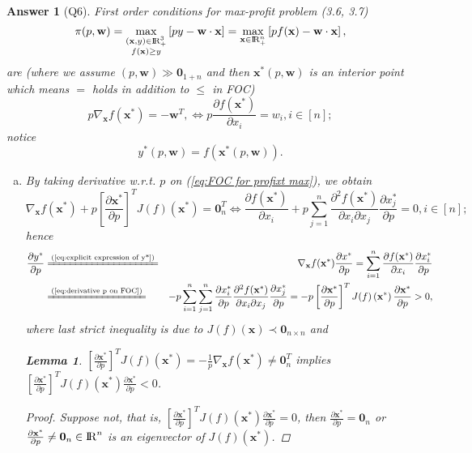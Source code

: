 \documentclass{article}
\newtheorem*{ans}{Answer}
\newtheorem{lem}[theorem]{Lemma}
\newcommand {\Reals}  {{\rm I \! R}}
\newcommand{\1}{{\bf 1}}
\newcommand{\0}{{\mathbf{0}}}
\newcommand{\w}{{\mathbf{w}}}
\newcommand{\x}{{\mathbf{x}}}
\newcommand{\<}{\langle}
\renewcommand{\>}{\rangle}
\begin{document}
\begin{ans}[Q6] First order conditions for max-profit problem (3.6, 3.7) 
	$$ \pi(p, \w) = \max_{\substack{(\x, y ) \in \Reals_+^3 \\ f(\x) \ge y}} \left[ p y - \w \cdot \x \right]  =  \max_{\x \in \Reals_+^n} \left[ p f(\x) - \w \cdot \x \right], $$ are (where we assume $(p, \w) \gg \0_{1+n}$ and then $\x^* (p,\w)$ is an interior point which means $=$ holds in addition to $\le $ in FOC)
\begin{equation}  p 	\nabla_{\x} f(\x^*)  = -\w^T, \Leftrightarrow p\frac{\partial f(\x^*)}{\partial x_i} =  w_i,i \in [n]; \label{eq:FOC for profixt max}
\end{equation}
 notice 
 \begin{equation}y^*(p,\w) = f\left(\x^* (p, \w) \right).\label{eq:explicit expression of y*}
 \end{equation}
	\begin{enumerate}[(a)]
		\item 
		
		
		By taking derivative w.r.t. $p$ on (\ref{eq:FOC for profixt max}), we obtain
\begin{equation} \nabla_{\x} f(\x^*) + p \left[\frac{ \partial \x^*}{\partial p}\right]^T J(f) \left( \x^* \right)  = \0_n^T  \Leftrightarrow \frac{\partial f(\x^*)}{\partial x_i}   +p \sum_{j=1}^n \frac{\partial^2 f(\x^*)}{\partial x_i \partial x_j}\frac{\partial x_j^*}{\partial p}  = 0,i \in [n]; \label{eq:derivative p on FOC}
\end{equation}
		hence 
		\begin{eqnarray*}
		\frac{\partial y^*}{\partial p} & \xlongequal{\text{(\ref{eq:explicit expression of y*})}} &  \nabla_{\x} f(\x^*) \frac{\partial x^*}{\partial p} = \sum_{i = 1}^n \frac{\partial f(\x^*)}{\partial x_i} \frac{\partial x_i^*}{\partial p} \\ &\xlongequal{\text{(\ref{eq:derivative p on FOC})}} &- p 	 \sum_{i = 1}^n\sum_{j=1}^n \frac{\partial x_i^*}{\partial p} \frac{\partial^2 f(\x^*)}{\partial x_i \partial x_j}\frac{\partial x_j^*}{\partial p}   =  - p \left[\frac{ \partial \x^*}{\partial p}\right]^T J(f) \left( \x^* \right) \frac{ \partial \x^*}{\partial p} > 0,
		\end{eqnarray*}
	where last strict inequality is due to $J(f)(\x) \prec \0_{n \times n}$ and 
\begin{mdframed}
		\begin{lem}
		$\left[\frac{ \partial \x^*}{\partial p}\right]^T J(f) \left( \x^* \right) =  - \frac1p \nabla_{\x} f(\x^*) \ne \0_n^T$ implies $\left[\frac{ \partial \x^*}{\partial p}\right]^T J(f) \left( \x^* \right) \frac{ \partial \x^*}{\partial p} < 0$.
	\end{lem}
\end{mdframed}
\begin{proof}
		Suppose not, that is, $\left[\frac{ \partial \x^*}{\partial p}\right]^T J(f) \left( \x^* \right) \frac{ \partial \x^*}{\partial p} = 0$, then $\frac{ \partial \x^*}{\partial p} =\0_n$ or $\frac{ \partial \x^*}{\partial p} \ne \0_n \in \Reals^n$ is an eigenvector of $J(f) \left( \x^* \right) $.
		

\end{proof}
\end{enumerate}
\end{ans}
\end{document}
